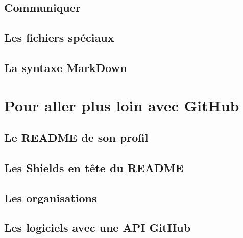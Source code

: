 \documentclass{beamer}
\begin{document}
\subsection{Communiquer}
\begin{frame}{}
\end{frame}


\subsection{Les fichiers spéciaux}
\begin{frame}{}
\end{frame}


\subsection{La syntaxe MarkDown}
\begin{frame}{}
\end{frame}





\section{Pour aller plus loin avec GitHub}


\subsection{Le README de son profil}
\begin{frame}{}
\end{frame}


\subsection{Les Shields en tête du README}
\begin{frame}{}
\end{frame}


\subsection{Les organisations}
\begin{frame}{}
\end{frame}


\subsection{Les logiciels avec une API GitHub}
\begin{frame}{}
\end{frame}
\end{document}
